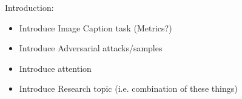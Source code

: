 Introduction:
\begin{itemize}
    \item Introduce Image Caption task (Metrics?)
    \item Introduce Adversarial attacks/samples
    \item Introduce attention
    \item Introduce Research topic (i.e. combination of these things)
\end{itemize}









